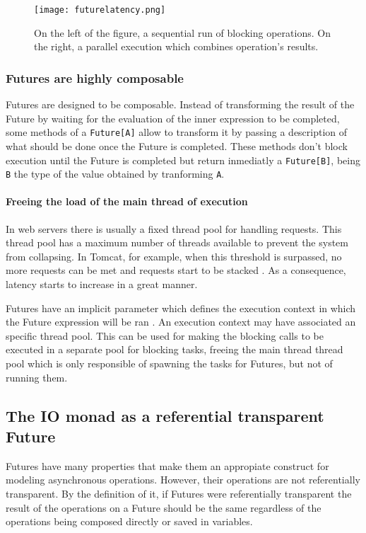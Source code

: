 \documentclass[../main.tex]{subfiles}
\begin{document}
\begin{figure}[ht]
  \centering
  \texttt{[image: futurelatency.png]}
  \caption{\label{fig:futurelatency}
    On the left of the figure, a sequential run of blocking operations. On
    the right, a parallel execution which combines operation's results.
  }
\end{figure}

\subsubsection{Futures are highly composable}
Futures are designed to be composable. Instead of transforming the result of the
Future by waiting for the evaluation of the inner expression to be completed,
some methods of a \texttt{Future[A]} allow to transform it by passing a description of what
should be done once the Future is completed. These methods don't block execution until the
Future is completed but return inmediatly a \texttt{Future[B]}, being \texttt{B} the type of
the value obtained by tranforming \texttt{A}.

\paragraph{Freeing the load of the main thread of execution}

In web servers there is usually a fixed thread pool for handling requests. This
thread pool has a maximum number of threads available to prevent the system
from collapsing. In Tomcat,
for example, when this threshold is surpassed, no more
requests can be met and requests start to be stacked \autocite{TheApacheSoftwareFoundation2020ApacheConnector}. As a consequence, latency
starts to increase in a great manner.

Futures have an implicit parameter which defines the execution context in which
the Future expression will be ran \autocite{ScalaScala.concurrent.ExecutionContext}. An
execution context may have associated an specific thread pool. This can be used
for making the blocking calls to be executed in a separate pool for blocking
tasks, freeing the main thread thread pool which is only responsible of spawning the tasks
for Futures, but not of running them.

\subsection{The IO monad as a referential transparent Future}
Futures have many properties that make them an appropiate construct for modeling
asynchronous operations. However, their operations are not referentially transparent.
By the definition of it, if Futures were referentially transparent the result of the operations on a
Future should be the same regardless of the operations being composed
directly or saved in variables.
\end{document}
